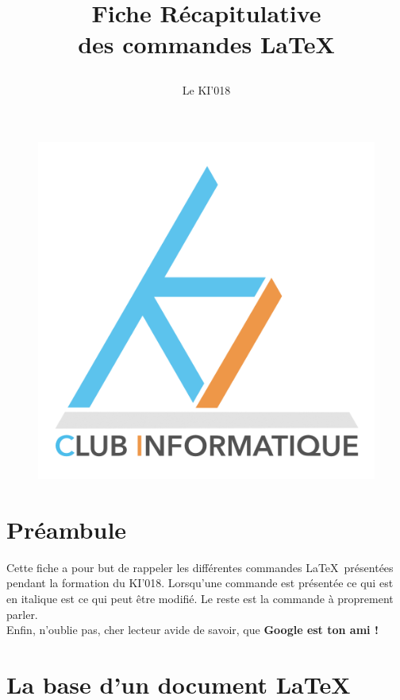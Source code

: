 \documentclass[11pt]{article}				%
\title{\textbf{Fiche Récapitulative \\ des commandes \LaTeX}
\author{Le KI'018}
\date{}
}
\begin{document}
\maketitle

\begin{figure}[h]
\begin{center}
\includegraphics[scale=0.7]{moyen.png}
\end{center}
\end{figure}

\section*{Préambule}

Cette fiche a pour but de rappeler les différentes commandes \LaTeX \ présentées pendant la formation du KI'018. Lorsqu'une commande est présentée ce qui est en italique est ce qui peut être modifié. Le reste est la commande à proprement parler. \\
Enfin, n'oublie pas, cher lecteur avide de savoir, que \textbf{Google est ton ami !}

\tableofcontents



\newpage



\section{La base d'un document \LaTeX}
\end{document}
